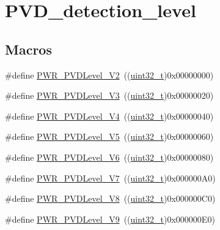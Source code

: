 \hypertarget{group___p_v_d__detection__level}{}\section{P\+V\+D\+\_\+detection\+\_\+level}
\label{group___p_v_d__detection__level}
\subsection*{Macros}
\begin{DoxyCompactItemize}
\item 
\#define \hyperlink{group___p_v_d__detection__level_ga5cf8b09ed099c7412fcee6ccec2ec20b}{P\+W\+R\+\_\+\+P\+V\+D\+Level\+\_\+V2}~((\hyperlink{_p_e___types_8h_a33594304e786b158f3fb30289278f5af}{uint32\+\_\+t})0x00000000)
\item 
\#define \hyperlink{group___p_v_d__detection__level_ga561e543dedb4c2cb126ec8d9d604260c}{P\+W\+R\+\_\+\+P\+V\+D\+Level\+\_\+V3}~((\hyperlink{_p_e___types_8h_a33594304e786b158f3fb30289278f5af}{uint32\+\_\+t})0x00000020)
\item 
\#define \hyperlink{group___p_v_d__detection__level_ga5b585e7e6eda29e8b119e16779ba7a8b}{P\+W\+R\+\_\+\+P\+V\+D\+Level\+\_\+V4}~((\hyperlink{_p_e___types_8h_a33594304e786b158f3fb30289278f5af}{uint32\+\_\+t})0x00000040)
\item 
\#define \hyperlink{group___p_v_d__detection__level_gad91e74c3034a5baccca70250815e680e}{P\+W\+R\+\_\+\+P\+V\+D\+Level\+\_\+V5}~((\hyperlink{_p_e___types_8h_a33594304e786b158f3fb30289278f5af}{uint32\+\_\+t})0x00000060)
\item 
\#define \hyperlink{group___p_v_d__detection__level_ga46174e5288082b59473068a3ca8e8ea6}{P\+W\+R\+\_\+\+P\+V\+D\+Level\+\_\+V6}~((\hyperlink{_p_e___types_8h_a33594304e786b158f3fb30289278f5af}{uint32\+\_\+t})0x00000080)
\item 
\#define \hyperlink{group___p_v_d__detection__level_ga72d22a858d8289ef02fff45f4810b916}{P\+W\+R\+\_\+\+P\+V\+D\+Level\+\_\+V7}~((\hyperlink{_p_e___types_8h_a33594304e786b158f3fb30289278f5af}{uint32\+\_\+t})0x000000\+A0)
\item 
\#define \hyperlink{group___p_v_d__detection__level_ga5f38835a95c026b1db16dbebf81b45a2}{P\+W\+R\+\_\+\+P\+V\+D\+Level\+\_\+V8}~((\hyperlink{_p_e___types_8h_a33594304e786b158f3fb30289278f5af}{uint32\+\_\+t})0x000000\+C0)
\item 
\#define \hyperlink{group___p_v_d__detection__level_ga9c156a7155f9946c0d3a73794f51a1ce}{P\+W\+R\+\_\+\+P\+V\+D\+Level\+\_\+V9}~((\hyperlink{_p_e___types_8h_a33594304e786b158f3fb30289278f5af}{uint32\+\_\+t})0x000000\+E0)

\end{DoxyCompactItemize}
